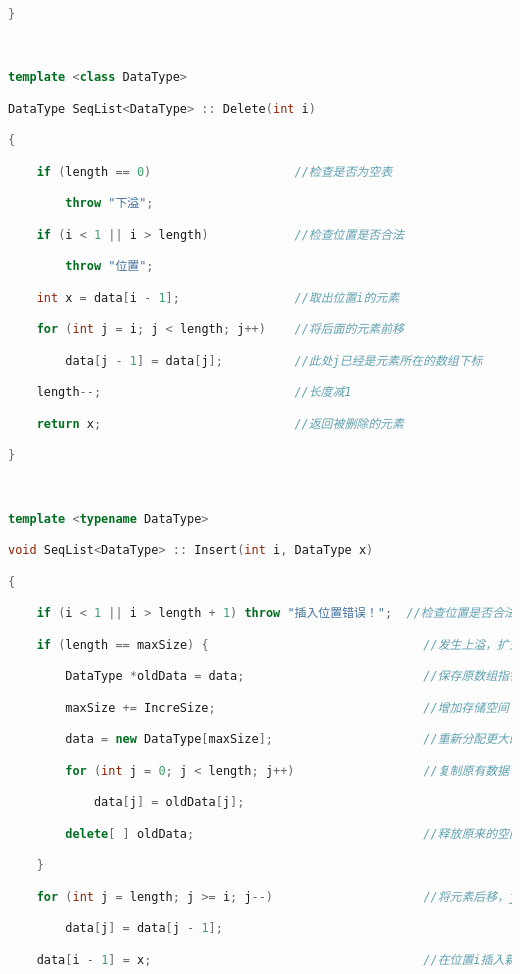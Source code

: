 \begin{lstlisting}[language=C++]
}

  

template <class DataType>  

DataType SeqList<DataType> :: Delete(int i)

{

    if (length == 0)                    //检查是否为空表

        throw "下溢";

    if (i < 1 || i > length)            //检查位置是否合法

        throw "位置";

    int x = data[i - 1];                //取出位置i的元素

    for (int j = i; j < length; j++)    //将后面的元素前移

        data[j - 1] = data[j];          //此处j已经是元素所在的数组下标

    length--;                           //长度减1

    return x;                           //返回被删除的元素

}

  

template <typename DataType>  

void SeqList<DataType> :: Insert(int i, DataType x)

{

    if (i < 1 || i > length + 1) throw "插入位置错误！";  //检查位置是否合法

    if (length == maxSize) {                              //发生上溢，扩充存储空间

        DataType *oldData = data;                         //保存原数组指针

        maxSize += IncreSize;                             //增加存储空间

        data = new DataType[maxSize];                     //重新分配更大的空间

        for (int j = 0; j < length; j++)                  //复制原有数据

            data[j] = oldData[j];

        delete[ ] oldData;                                //释放原来的空间

    }

    for (int j = length; j >= i; j--)                     //将元素后移，j表示元素序号

        data[j] = data[j - 1];

    data[i - 1] = x;                                      //在位置i插入新元素


\end{lstlisting}
